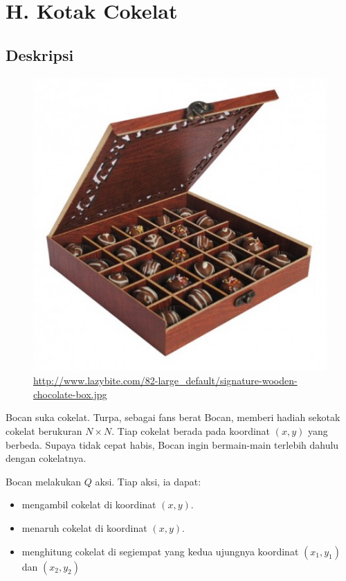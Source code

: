 \documentclass{article}
\begin{document}
\pagestyle{fancy}
\fancyhf{}
\renewcommand{\headrulewidth}{0pt}

\section*{\hfil H. Kotak Cokelat\hfil}


\subsection*{Deskripsi}

\begin{figure}[h!]
	\centering
	\includegraphics[width=0.5\linewidth]{box-of-chocolate}
	\caption{\url{http://www.lazybite.com/82-large_default/signature-wooden-chocolate-box.jpg}}
\end{figure}

\par\noindent Bocan suka cokelat. Turpa, sebagai fans berat Bocan, memberi hadiah sekotak cokelat berukuran $N \times N$. Tiap cokelat berada pada koordinat $(x,y)$ yang berbeda. Supaya tidak cepat habis, Bocan ingin bermain-main terlebih dahulu dengan cokelatnya.

\par\noindent Bocan melakukan $Q$ aksi. Tiap aksi, ia dapat:

\begin{itemize}
	\item mengambil cokelat di koordinat $(x,y)$.
	\item menaruh cokelat di koordinat $(x,y)$.
	\item menghitung cokelat di segiempat yang kedua ujungnya koordinat $(x_1,y_1)$ dan $(x_2,y_2)$
\end{itemize}
\end{document}
